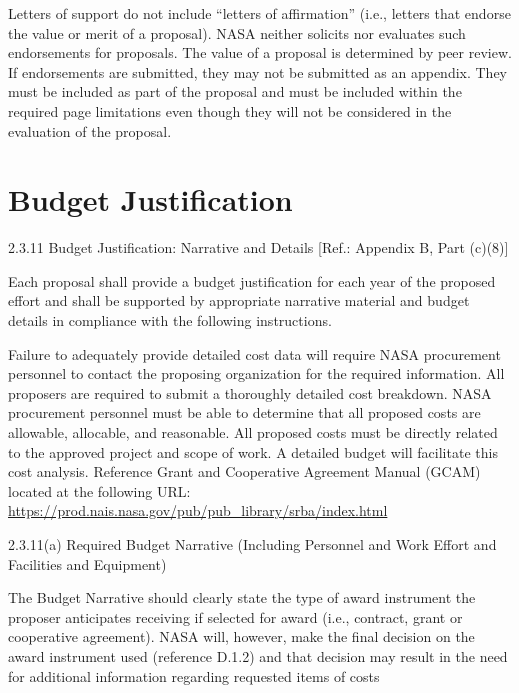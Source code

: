 \documentclass[12pt]{article}
\begin{document}
Letters of support do not include ``letters of affirmation'' (i.e.,
letters that endorse the value or merit of a proposal). NASA neither
solicits nor evaluates such endorsements for proposals. The value of a
proposal is determined by peer review. If endorsements are submitted,
they may not be submitted as an appendix. They must be included as
part of the proposal and must be included within the required page
limitations even though they will not be considered in the evaluation
of the proposal.



\cleardoublepage

\section*{Budget Justification}
2.3.11 Budget Justification: Narrative and Details [Ref.: Appendix B, Part (c)(8)]

Each proposal shall provide a budget justification for each year of
the proposed effort and shall be supported by appropriate narrative
material and budget details in compliance with the following
instructions.

Failure to adequately provide detailed cost data will require NASA
procurement personnel to contact the proposing organization for the
required information. All proposers are required to submit a
thoroughly detailed cost breakdown. NASA procurement personnel must be
able to determine that all proposed costs are allowable, allocable,
and reasonable. All proposed costs must be directly related to the
approved project and scope of work. A detailed budget will facilitate
this cost analysis. Reference Grant and Cooperative Agreement Manual
(GCAM) located at the following URL:
\url{https://prod.nais.nasa.gov/pub/pub_library/srba/index.html}

2.3.11(a) Required Budget Narrative (Including Personnel and Work
Effort and Facilities and Equipment)

The Budget Narrative should clearly state the type of award instrument
the proposer anticipates receiving if selected for award (i.e.,
contract, grant or cooperative agreement). NASA will, however, make
the final decision on the award instrument used (reference D.1.2) and
that decision may result in the need for additional information
regarding requested items of costs
\end{document}
